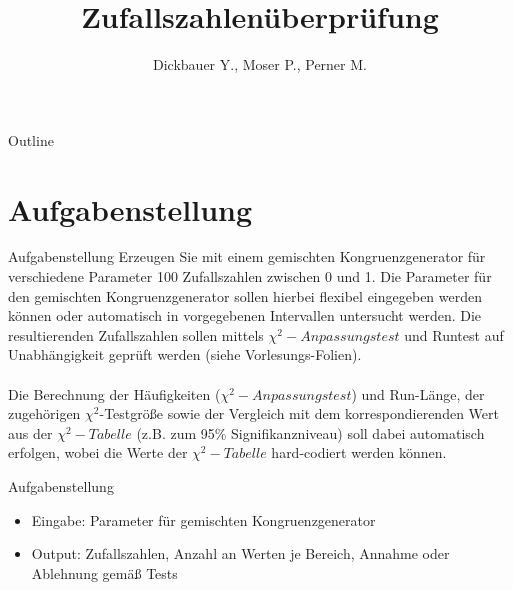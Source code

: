 

\title[BSP25 - Zufallszahlenüberprüfung]{Zufallszahlenüberprüfung}
\author{Dickbauer Y., Moser P., Perner M.}



\begin{frame}
  \titlepage
\end{frame}

\begin{frame}{Outline}
  \tableofcontents
\end{frame}

\section{Aufgabenstellung}
\begin{frame}{Aufgabenstellung}
Erzeugen Sie mit einem gemischten Kongruenzgenerator für verschiedene Parameter 100 Zufallszahlen zwischen 0 und 1. Die Parameter für den gemischten Kongruenzgenerator sollen hierbei flexibel eingegeben werden können oder automatisch in vorgegebenen Intervallen untersucht werden. Die resultierenden Zufallszahlen sollen mittels $\chi^2-Anpassungstest$ und Runtest auf Unabhängigkeit geprüft werden (siehe Vorlesungs-Folien). \\~\\
Die Berechnung der Häufigkeiten ($\chi^2-Anpassungstest$) und Run-Länge, der zugehörigen $\chi^2$-Testgröße sowie der Vergleich mit dem korrespondierenden Wert aus der $\chi^2-Tabelle$ (z.B. zum 95\% Signifikanzniveau) soll dabei automatisch erfolgen, wobei die Werte der $\chi^2-Tabelle$ hard-codiert werden können.
\end{frame}

\begin{frame}{Aufgabenstellung}

\begin{itemize}
  \item Eingabe: Parameter für gemischten Kongruenzgenerator
  \vspace{1cm}
  \item Output: Zufallszahlen, Anzahl an Werten je Bereich, Annahme oder Ablehnung gemäß Tests
\end{itemize}
\end{frame}

